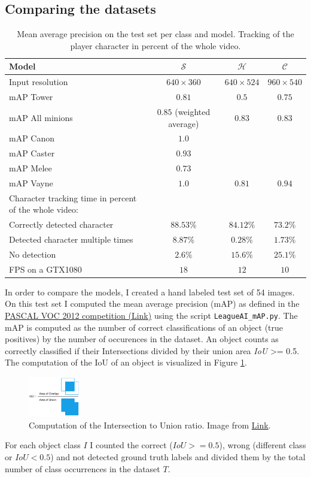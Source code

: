 \subsection{Comparing the datasets}
\begin{table}
\centering
\caption{Mean average precision on the test set per class and model. Tracking of the player character in percent of the whole video.}
\label{tab:2}
\begin{tabular}{|l|ccc|}
\hline
	Model 			& $\mathcal{S}$ & $\mathcal{H}$ & $\mathcal{C}$ \\
\hline
	Input resolution& $640 \times 360$ & $640 \times 524$ & $960 \times 540$\\
\hline
	mAP Tower		& $0.81$	& $0.5$  & $0.75$ \\
	mAP All minions & $0.85$ (weighted average)	& $0.83$ & $0.83$ \\
	mAP Canon		& $1.0$		&		 & \\
	mAP	Caster		& $0.93$	& 		 & \\
	mAP Melee		& $0.73$	&		 &\\
	mAP Vayne		& $1.0$		& $0.81$	& $0.94$\\
\hline
	Character tracking time in percent of the whole video: & & &\\
\hline
	Correctly detected character & $88.53\%$ & $84.12\%$ & $73.2\%$ \\
	Detected character multiple times & $8.87\%$ & $0.28\%$ & $1.73\%$ \\
	No detection 	& $2.6\%$ & $15.6\%$ & $25.1\%$\\
	FPS	on a GTX1080		& $18$		& $12$ & $10$\\
\hline
\end{tabular}
\end{table}
In order to compare the models, I created a hand labeled test set of 54 images.
On this test set I computed the mean average precision (mAP) as defined in the \href{http://host.robots.ox.ac.uk/pascal/VOC/voc2012/}{PASCAL VOC 2012 competition (Link)} using the script \texttt{LeagueAI\_mAP.py}.
The mAP is computed as the number of correct classifications of an object (true positives) by the number of occurences in the dataset.
An object counts as correctly classified if their Intersections divided by their union area \textit{IoU} >= 0.5.
The computation of the IoU of an object is visualized in Figure \ref{fig:iou}.
\begin{figure}[h]
\centering
\includegraphics[width=0.2\textwidth]{figures/iou_equation.png}
\caption{Computation of the Intersection to Union ratio. Image from \href{https://www.pyimagesearch.com/wp-content/uploads/2016/09/iou_equation.png}{Link}.}
\label{fig:iou}
\end{figure}
For each object class $I$ I counted the correct ($IoU >= 0.5$), wrong (different class or $IoU < 0.5$) and not detected ground truth labels and divided them by the total number of class occurrences in the dataset $T$.

